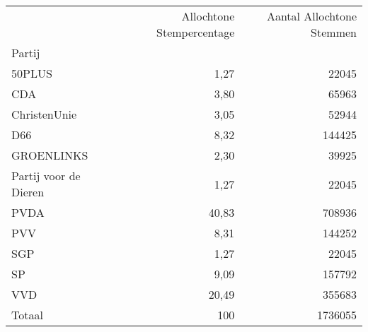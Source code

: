 \begin{tabular}{lrr}
\toprule
{} &  Allochtone Stempercentage &  Aantal Allochtone Stemmen \\
Partij                &                            &                            \\
\midrule
50PLUS                &                       1,27 &                      22045 \\
CDA                   &                       3,80 &                      65963 \\
ChristenUnie          &                       3,05 &                      52944 \\
D66                   &                       8,32 &                     144425 \\
GROENLINKS            &                       2,30 &                      39925 \\
Partij voor de Dieren &                       1,27 &                      22045 \\
PVDA                  &                      40,83 &                     708936 \\
PVV                   &                       8,31 &                     144252 \\
SGP                   &                       1,27 &                      22045 \\
SP                    &                       9,09 &                     157792 \\
VVD                   &                      20,49 &                     355683 \\
\midrule
Totaal				& 						100 & 			1736055 \\
\bottomrule
\end{tabular}



